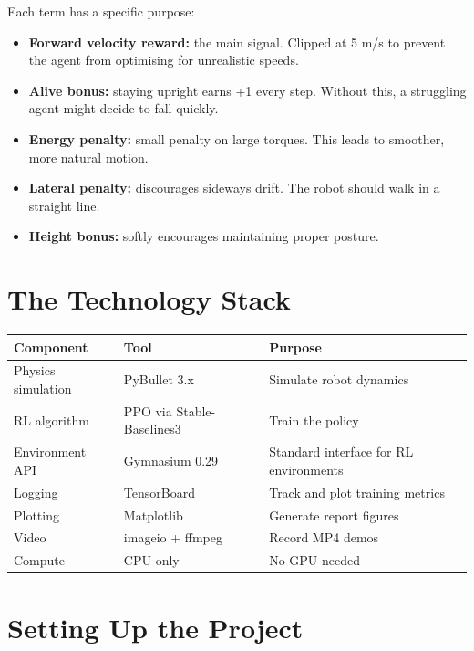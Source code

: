 \documentclass[12pt, a4paper]{article}
\begin{document}
Each term has a specific purpose:
\begin{itemize}
    \item \textbf{Forward velocity reward:} the main signal. Clipped at 5 m/s to prevent the agent from optimising for unrealistic speeds.
    \item \textbf{Alive bonus:} staying upright earns +1 every step. Without this, a struggling agent might decide to fall quickly.
    \item \textbf{Energy penalty:} small penalty on large torques. This leads to smoother, more natural motion.
    \item \textbf{Lateral penalty:} discourages sideways drift. The robot should walk in a straight line.
    \item \textbf{Height bonus:} softly encourages maintaining proper posture.
\end{itemize}

\section{The Technology Stack}

\begin{center}
\begin{tabular}{lll}
    \toprule
    Component & Tool & Purpose \\
    \midrule
    Physics simulation & PyBullet 3.x & Simulate robot dynamics \\
    RL algorithm & PPO via Stable-Baselines3 & Train the policy \\
    Environment API & Gymnasium 0.29 & Standard interface for RL environments \\
    Logging & TensorBoard & Track and plot training metrics \\
    Plotting & Matplotlib & Generate report figures \\
    Video & imageio + ffmpeg & Record MP4 demos \\
    Compute & CPU only & No GPU needed \\
    \bottomrule
\end{tabular}
\end{center}

\section{Setting Up the Project}
\end{document}
